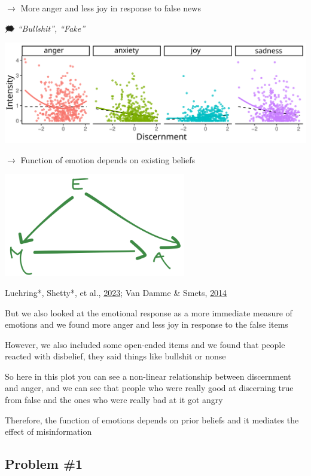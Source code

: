 \documentclass[
  letterpaper,
  DIV=11,
  numbers=noendperiod]{scrartcl}
\begin{document}
\(\rightarrow\) More anger and less joy in response to false news

🗯 \emph{``Bullshit'', ``Fake''}

\includegraphics[width=8.33333in,height=\textheight]{images/curvi-linear.svg}

\(\rightarrow\) Function of emotion depends on existing beliefs

\includegraphics[width=3.125in,height=\textheight]{images/mediating-relationship.png}

Luehring*, Shetty*, et al., \href{https://psyarxiv.com/udqms/}{2023};
Van Damme \& Smets,
\href{https://psycnet.apa.org/record/2013-39652-001}{2014}

But we also looked at the emotional response as a more immediate measure
of emotions and we found more anger and less joy in response to the
false items

However, we also included some open-ended items and we found that people
reacted with disbelief, they said things like bullshit or nonse

So here in this plot you can see a non-linear relationship between
discernment and anger, and we can see that people who were really good
at discerning true from false and the ones who were really bad at it got
angry

Therefore, the function of emotions depends on prior beliefs and it
mediates the effect of misinformation

\hypertarget{problem-1}{%
\subsection{Problem \#1}\label{problem-1}}
\end{document}
